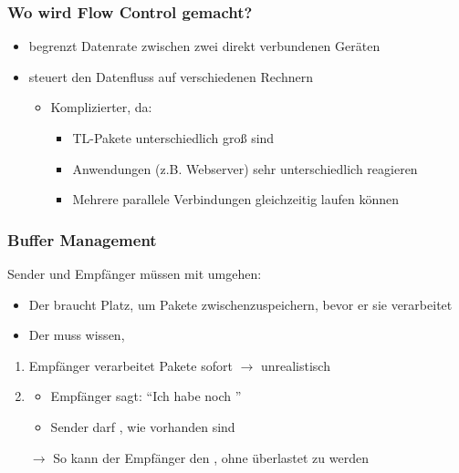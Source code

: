 \subsubsection*{Wo wird Flow Control gemacht?}
\begin{itemize}
    \item {} begrenzt Datenrate zwischen zwei direkt verbundenen Geräten
    \item {} steuert den Datenfluss  auf verschiedenen Rechnern
    \begin{itemize}
        \item Komplizierter, da:
        \begin{itemize}
            \item TL-Pakete unterschiedlich groß sind
            \item Anwendungen (z.B. Webserver) sehr unterschiedlich reagieren
            \item Mehrere parallele Verbindungen gleichzeitig laufen können
        \end{itemize}
    \end{itemize}
\end{itemize}
\subsubsection*{Buffer Management}
Sender und Empfänger müssen mit  umgehen:
\begin{itemize}
    \item Der  braucht Platz, um Pakete zwischenzuspeichern, bevor er sie verarbeitet
    \item Der  muss wissen, 
\end{itemize}
\begin{enumerate}
    \item {} Empfänger verarbeitet Pakete sofort $\rightarrow$ unrealistisch
    \item {}
    \begin{itemize}
        \item Empfänger sagt: \enquote{Ich habe noch }
        \item Sender darf , wie  vorhanden sind
    \end{itemize}
    $\rightarrow$ So kann der Empfänger den , ohne überlastet zu werden
\end{enumerate}
